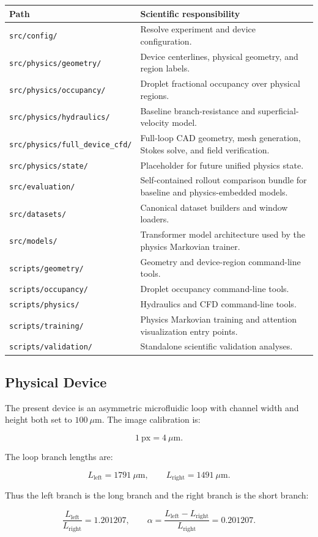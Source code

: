 \begin{longtable}{@{}ll@{}}
\toprule
Path & Scientific responsibility \\
\midrule
\texttt{src/config/} & Resolve experiment and device configuration. \\
\texttt{src/physics/geometry/} & Device centerlines, physical geometry, and region labels. \\
\texttt{src/physics/occupancy/} & Droplet fractional occupancy over physical regions. \\
\texttt{src/physics/hydraulics/} & Baseline branch-resistance and superficial-velocity model. \\
\texttt{src/physics/full\_device\_cfd/} & Full-loop CAD geometry, mesh generation, Stokes solve, and field verification. \\
\texttt{src/physics/state/} & Placeholder for future unified physics state. \\
\texttt{src/evaluation/} & Self-contained rollout comparison bundle for baseline and physics-embedded models. \\
\texttt{src/datasets/} & Canonical dataset builders and window loaders. \\
\texttt{src/models/} & Transformer model architecture used by the physics Markovian trainer. \\
\texttt{scripts/geometry/} & Geometry and device-region command-line tools. \\
\texttt{scripts/occupancy/} & Droplet occupancy command-line tools. \\
\texttt{scripts/physics/} & Hydraulics and CFD command-line tools. \\
\texttt{scripts/training/} & Physics Markovian training and attention visualization entry points. \\
\texttt{scripts/validation/} & Standalone scientific validation analyses. \\
\bottomrule
\end{longtable}

\subsection{Physical Device}

The present device is an asymmetric microfluidic loop with channel width and
height both set to \(100~\mu\mathrm{m}\). The image calibration is:

\[
1~\mathrm{px} = 4~\mu\mathrm{m}.
\]

The loop branch lengths are:

\[
L_{\mathrm{left}} = 1791~\mu\mathrm{m},
\qquad
L_{\mathrm{right}} = 1491~\mu\mathrm{m}.
\]

Thus the left branch is the long branch and the right branch is the short
branch:

\[
\frac{L_{\mathrm{left}}}{L_{\mathrm{right}}} = 1.201207,
\qquad
\alpha = \frac{L_{\mathrm{left}} - L_{\mathrm{right}}}{L_{\mathrm{right}}}
= 0.201207.
\]
